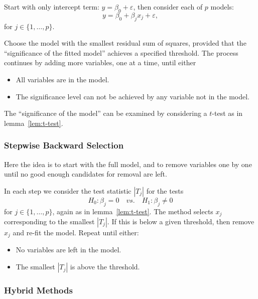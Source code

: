 \documentclass[
  a4paper,
]{article}
\providecommand{\tightlist}{%
  \setlength{\itemsep}{0pt}\setlength{\parskip}{0pt}}
\theoremstyle{definition}
\theoremstyle{definition}
\theoremstyle{definition}
\theoremstyle{definition}
\theoremstyle{remark}
\begin{document}
Start with only intercept term: \(y=\beta_0 + \varepsilon\), then
consider each of \(p\) models:
\begin{equation*}
  y
  = \beta_0 + \beta_j x_j + \varepsilon,
\end{equation*}
for \(j \in \{1, \ldots, p\}\).

Choose the model with the smallest residual sum of squares, provided that the
``significance of the fitted model'' achieves a specified threshold. The process
continues by adding more variables, one at a time, until either

\begin{itemize}
\tightlist
\item
  All variables are in the model.
\item
  The significance level can not be achieved by any variable not in the model.
\end{itemize}

The ``significance of the model'' can be examined by considering a
\(t\)-test as in lemma~\ref{lem:t-test}.

\subsubsection{Stepwise Backward Selection}\label{stepwise-backward-selection}

Here the idea is to start with the full model, and to remove variables
one by one until no good enough candidates for removal are left.

In each step we consider the test statistic \(|T_j|\) for the tests
\begin{equation*}
  H_0\colon \beta_j = 0
  \quad \textit{vs.} \quad
  H_1\colon \beta_j \neq 0
\end{equation*}
for \(j \in \{1, \ldots, p\}\), again as in lemma~\ref{lem:t-test}.
The method selects \(x_j\) corresponding to the smallest \(|T_j|\).
If this is below a given threshold, then remove \(x_j\) and re-fit the model.
Repeat until either:

\begin{itemize}
\tightlist
\item
  No variables are left in the model.
\item
  The smallest \(|T_j|\) is above the threshold.
\end{itemize}

\subsubsection{Hybrid Methods}\label{hybrid-methods}
\end{document}
